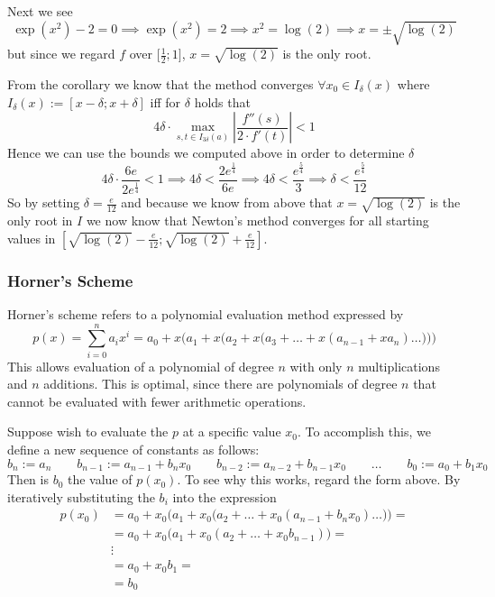 \begin{example}
   Next we see
   \[\exp(x^2) - 2 = 0 \implies \exp(x^2) = 2 \implies x^2 = \log(2) \implies x = \pm \sqrt{\log(2)}\]
   but since we regard \(f\) over \(\big[\frac{1}{2}; 1\big]\), \(x = \sqrt{\log(2)}\) is the only root.

   From the corollary we know that the method converges \(\forall x_0 \in I_\delta(x)\) where \(I_\delta(x) := [x - \delta; x + \delta]\) iff for \(\delta\) holds that
   \[4\delta \cdot \max_{s,t \in I_{3\delta}(a)} \left|\frac{f''(s)}{2 \cdot f'(t)}\right| < 1\]
   Hence we can use the bounds we computed above in order to determine \(\delta\)
   \[4 \delta \cdot \frac{6e}{2e^\frac{1}{4}} < 1 \implies 4 \delta < \frac{2 e^\frac{1}{4}}{6e} \implies 4 \delta < \frac{e^\frac{5}{4}}{3} \implies \delta < \frac{e^\frac{5}{4}}{12}\]
   So by setting \(\delta = \frac{e}{12}\) and because we know from above that \(x = \sqrt{\log(2)}\) is the only root in \(I\) we now know that Newton's method converges for all starting values in \(\left[\sqrt{\log(2)} - \frac{e}{12}; \sqrt{\log(2)} + \frac{e}{12}\right]\).
\end{example}



\subsubsection{Horner's Scheme}
Horner's scheme refers to a polynomial evaluation method expressed by
\[p(x) = \sum_{i=0}^{n} a_i x^i = a_0 + x\bigg(a_1 + x\Big(a_2 + x\big(a_3 + \ldots + x(a_{n-1} + xa_n) \ldots\big)\Big)\bigg)\]
This allows evaluation of a polynomial of degree \(n\) with only \(n\) multiplications and \(n\) additions.
This is optimal, since there are polynomials of degree \(n\) that cannot be evaluated with fewer arithmetic operations.

Suppose wish to evaluate the \(p\) at a specific value \(x_0\).
To accomplish this, we define a new sequence of constants as follows:
\[b_n := a_n \qquad b_{n-1} := a_{n-1} + b_nx_0 \qquad b_{n-2} := a_{n-2} + b_{n-1} x_0 \qquad \ldots \qquad b_0 := a_0 + b_1 x_0\]
Then is \(b_0\) the value of \(p(x_0)\).
To see why this works, regard the form above.
By iteratively substituting the \(b_i\) into the expression
\begin{equation*}
   \begin{split}
      p(x_0) & = a_0 + x_0\Big(a_1 + x_0\big(a_2 + \ldots + x_0(a_{n-1} + b_nx_0)\ldots\big)\Big) = \\
             & = a_0 + x_0\big(a_1 + x_0(a_2 + \ldots + x_0b_{n-1})\big) = \\
             & \vdots \\
             & = a_0 + x_0 b_1 = \\
             & = b_0
   \end{split}
\end{equation*}

